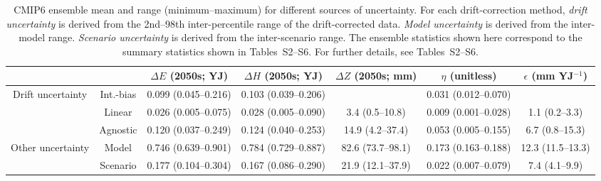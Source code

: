 \begin{table*}[t]
\centering
\caption{CMIP6 ensemble mean and range (minimum–maximum) for different sources of uncertainty. For each drift-correction method, \emph{drift uncertainty} is derived from the 2nd--98th inter-percentile range of the drift-corrected data. \emph{Model uncertainty} is derived from the inter-model range. \emph{Scenario uncertainty} is derived from the inter-scenario range. The ensemble statistics shown here correspond to the summary statistics shown in Tables~S2--S6. For further details, see Tables~S2--S6.}
\begin{tabular}{cc|c|c|c|c|c}
\toprule
 &  & $\Delta E$ (2050s; YJ) & $\Delta H$ (2050s; YJ) & $\Delta Z$ (2050s; mm) & $\eta$ (unitless) & $\epsilon$ (mm YJ$^{-1}$) \\
\midrule
\multirow[c]{3}{*}{Drift uncertainty} & Int.-bias & 0.099 (0.045–0.216) & 0.103 (0.039–0.206) &  & 0.031 (0.012–0.070) &  \\
 & Linear & 0.026 (0.005–0.075) & 0.028 (0.005–0.090) & 3.4 (0.5–10.8) & 0.009 (0.001–0.028) & 1.1 (0.2–3.3) \\
 & Agnostic & 0.120 (0.037–0.249) & 0.124 (0.040–0.253) & 14.9 (4.2–37.4) & 0.053 (0.005–0.155) & 6.7 (0.8–15.3) \\
\midrule
\multirow[c]{2}{*}{Other uncertainty} & Model & 0.746 (0.639–0.901) & 0.784 (0.729–0.887) & 82.6 (73.7–98.1) & 0.173 (0.163–0.188) & 12.3 (11.5–13.3) \\
 & Scenario & 0.177 (0.104–0.304) & 0.167 (0.086–0.290) & 21.9 (12.1–37.9) & 0.022 (0.007–0.079) & 7.4 (4.1–9.9) \\
\bottomrule
\end{tabular}
\end{table*}
